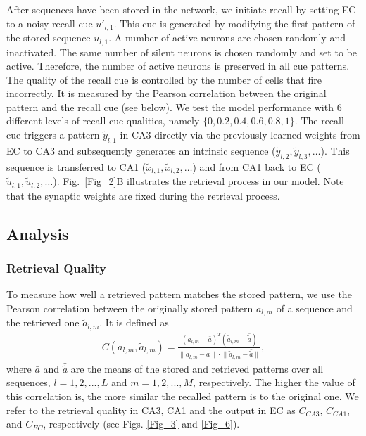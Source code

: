 \documentclass[utf8]{frontiersSCNS} %
\begin{document}
After sequences have been stored in the network, we initiate recall by setting EC to a noisy recall cue $u'_{l, 1}$. This cue is generated by modifying the first pattern of the stored sequence $u_{l, 1}$. A number of active neurons are chosen randomly and inactivated. The same number of silent neurons is chosen randomly and set to be active. 
%
Therefore, the number of active neurons is preserved in all cue patterns. 
%
The quality of the recall cue is controlled by the number of cells that fire incorrectly. It is measured by the Pearson correlation between the original pattern and the recall cue (see below). We test the model performance with $6$ different levels of recall cue qualities, namely $\{ 0, 0.2, 0.4, 0.6, 0.8, 1 \}$.
%
The recall cue triggers a pattern $\tilde{y}_{l, 1}$ in CA3 directly via the previously learned weights from EC to CA3 and subsequently generates an intrinsic sequence ($\tilde{y}_{l, 2}, \tilde{y}_{l, 3}, \ldots$). This sequence is transferred to CA1 ($\tilde{x}_{l, 1}, \tilde{x}_{l, 2}, \ldots$) and from CA1 back to EC ($\tilde{u}_{l, 1}, \tilde{u}_{l, 2}, \ldots$). Fig.~\ref{Fig_2}B illustrates the retrieval process in our model. Note that the synaptic weights are fixed during the retrieval process. 

\subsection{Analysis}

\subsubsection{Retrieval Quality}
To measure how well a retrieved pattern matches the stored pattern, we use the Pearson correlation between the originally stored pattern $a_{l, m}$ of a sequence and the retrieved one $\tilde{a}_{l, m}$. It is defined as
\begin{align*}
	C(a_{l, m},\tilde{a}_{l, m})  = \frac{(a_{l, m} -\bar{a})^T(\tilde{a}_{l, m} -\bar{\tilde{a}})}
{\lVert{a_{l, m} -\bar{a}} \rVert \cdot \lVert{\tilde{a}_{l, m} -\bar{\tilde{a}}}\rVert },
\end{align*}     
where $\bar{a}$ and $\bar{\tilde{a}}$ are the means of the stored and retrieved patterns over all sequences, $l = 1,2, ..., L$ and $m = 1,2, ..., M$, respectively. The higher the value of this correlation is, the more similar the recalled pattern is to the original one. We refer to the retrieval quality in CA3, CA1 and the output in EC as $C_{CA3}$, $C_{CA1}$, and $C_{EC}$, respectively (see Figs. \ref{Fig_3} and \ref{Fig_6}).
\end{document}
